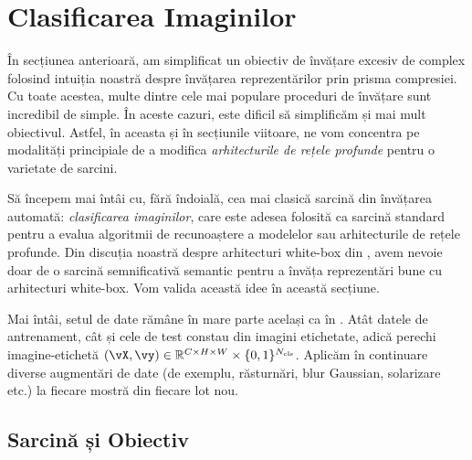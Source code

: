 \documentclass[../../book-main_ro.tex]{subfiles}
\begin{document}
\section{Clasificarea Imaginilor}\label{sec:image_classification}

În secțiunea anterioară, am simplificat un obiectiv de învățare excesiv de complex folosind intuiția noastră despre învățarea reprezentărilor prin prisma compresiei. Cu toate acestea, multe dintre cele mai populare proceduri de învățare sunt incredibil de simple. În aceste cazuri, este dificil să simplificăm și mai mult obiectivul. Astfel, în aceasta și în secțiunile viitoare, ne vom concentra pe modalități principiale de a modifica \textit{arhitecturile de rețele profunde} pentru o varietate de sarcini.

Să începem mai întâi cu, fără îndoială, cea mai clasică sarcină din învățarea automată: \textit{clasificarea imaginilor}, care este adesea folosită ca sarcină standard pentru a evalua algoritmii de recunoaștere a modelelor sau arhitecturile de rețele profunde. Din discuția noastră despre arhitecturi white-box din , avem nevoie doar de o sarcină semnificativă semantic pentru a învăța reprezentări bune cu arhitecturi white-box. Vom valida această idee în această secțiune.

Mai întâi, setul de date rămâne în mare parte același ca în . Atât datele de antrenament, cât și cele de test constau din imagini etichetate, adică perechi imagine-etichetă \((\vX, \vy) \in \R^{C \times H \times W} \times \{0, 1\}^{N_{\cls}}\). Aplicăm în continuare diverse augmentări de date (de exemplu, răsturnări, blur Gaussian, solarizare etc.) la fiecare mostră din fiecare lot nou.

\subsection{Sarcină și Obiectiv} \label{sub:image_classification_objective}
\end{document}
